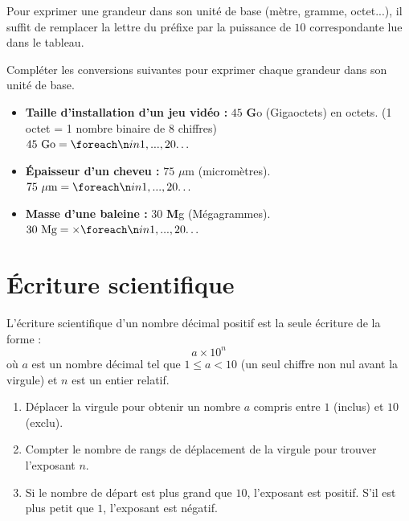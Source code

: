\documentclass[a4paper]{book}
\begin{document}
    \begin{methode}
        Pour exprimer une grandeur dans son unité de base (mètre, gramme, octet...), il suffit de remplacer la lettre du préfixe par la puissance de $10$ correspondante lue dans le tableau.
    \end{methode}
    
    \begin{exemple}
        Compléter les conversions suivantes pour exprimer chaque grandeur dans son unité de base.
        
        \begin{itemize}[label=\textbullet, itemsep=0.4cm]
            \item \textbf{Taille d'installation d'un jeu vidéo :} $45$ \textbf{G}o (Gigaoctets) en octets. (1 octet = 1 nombre binaire de 8 chiffres) \\[2ex]
            $45 \text{ Go} = \points[20]$
            
            \item \textbf{Épaisseur d'un cheveu :} $75$ \textbf{$\mu$}m (micromètres).\\[2ex]
            $75 \text{ } \mu\text{m} = \points[20]$
            
            \item \textbf{Masse d'une baleine :} $30$ \textbf{M}g (Mégagrammes). \\[2ex]
            $30 \text{ Mg} = \times \points[20]$
        \end{itemize}
    \end{exemple}
    

\section{Écriture scientifique}

    \begin{definition}
        L'écriture scientifique d'un nombre décimal positif est la seule écriture de la forme :
        $$a \times 10^n$$
        où $a$ est un nombre décimal tel que $1 \leqslant a < 10$ (un seul chiffre non nul avant la virgule) et $n$ est un entier relatif.
    \end{definition}
    
    \begin{methode}
        \begin{enumerate}
            \item Déplacer la virgule pour obtenir un nombre $a$ compris entre $1$ (inclus) et $10$ (exclu).
            \item Compter le nombre de rangs de déplacement de la virgule pour trouver l'exposant $n$.
            \item Si le nombre de départ est plus grand que $10$, l'exposant est positif. S'il est plus petit que $1$, l'exposant est négatif.
        \end{enumerate}
    \end{methode}
    
\end{document}
